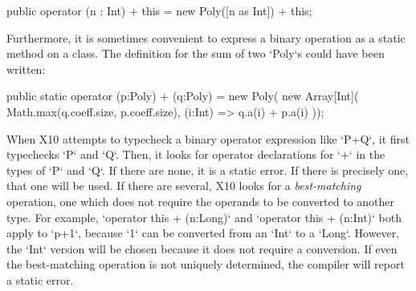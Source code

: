 \begin{ex}
% 
\begin{xten}
   public operator (n : Int) + this 
          = new Poly([n as Int]) + this;
\end{xten}
% 
%     

Furthermore, it is sometimes convenient to express a binary operation as a
static method on a class. 
The definition for the sum of two
\xcd`Poly`s could have been written:
\begin{xten}
  public static operator (p:Poly) + (q:Poly) =  new Poly(
     new Array[Int](
        Math.max(q.coeff.size, p.coeff.size),
        (i:Int) => q.a(i) + p.a(i)
     ));
\end{xten}
%
% 
%     

\end{ex}

When X10 attempts to typecheck a binary operator expression like \xcd`P+Q`, it
first typechecks \xcd`P` and \xcd`Q`. Then, it looks for operator declarations
for \xcd`+` in the types of \xcd`P` and \xcd`Q`. If there are none, it is a
static error. If there is precisely one, that one will be used. If there are
several, X10 looks for a {\em best-matching} operation, \viz{} one which does
not require the operands to be converted to another type. For example,
\xcd`operator this + (n:Long)` and \xcd`operator this + (n:Int)` both apply to
\xcd`p+1`, because \xcd`1` can be converted from an \xcd`Int` to a \xcd`Long`.
However, the \xcd`Int` version will be chosen because it does not require a
conversion. If even the best-matching operation is not uniquely determined,
the compiler will report a static error.


